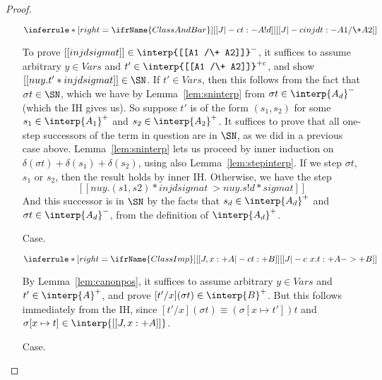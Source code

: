 \begin{proof}
\begin{itemize}
\vspace{-.2cm}
\begin{center}
\begin{math}
\inferrule* [right=\ifrName{ClassAndBar}] {[[J |-c t : - A ! d]]}{[[J |-c inj d t : - A1 /\+ A2]]}
\end{math}
\end{center}
To prove $[[inj d sigma t]]\in\interp{[[A1 /\+ A2]]}^-$, it suffices
to assume arbitrary $y\in\textit{Vars}$ and $t'\in\interp{[[A1 /\+
  A2]]}^{+c}$, and show $[[ nu y . t' * inj d sigma t]]\in\SN$.  If
$t'\in\textit{Vars}$, then this follows from the fact that $\sigma
t\in\SN$, which we have by Lemma~\ref{lem:sninterp} from $\sigma
t\in\interp{A_d}^-$ (which the IH gives us).  So suppose $t'$ is of
the form $(s_1,s_2)$ for some $s_1\in\interp{A_1}^+$ and
$s_2\in\interp{A_2}^+$.  It suffices to prove that all one-step
successors of the term in question are in $\SN$, as we did in a
previous case above.  Lemma~\ref{lem:sninterp} lets us proceed by
inner induction on $\delta(\sigma t) + \delta(s_1) + \delta(s_2)$,
using also Lemma~\ref{lem:stepinterp}.  If we step $\sigma t$, $s_1$
or $s_2$, then the result holds by inner IH.  Otherwise, we have the
step
\[
[[ nu y . (s1,s2) * inj d sigma t ~> nu y . s ! d * sigma t]]
\]
And this successor is in $\SN$ by the facts that $s_d\in\interp{A_d}^+$
and $\sigma t\in\interp{A_d}^-$, from the definition of $\interp{A_d}^+$.

\item[Case.]\ 

\vspace{-.2cm}
\begin{center}
\begin{math}
\inferrule* [right=\ifrName{ClassImp}] {[[J , x : + A |-c t : + B]]}{[[J |-c \ x . t : + A ->+ B]]}
\end{math}
\end{center}
By Lemma~\ref{lem:canonpos}, it suffices to assume arbitrary $y\in\textit{Vars}$ and $t'\in\interp{A}^+$,
and prove $[t'/x](\sigma t)\in\interp{B}^+$.  But this follows immediately from the IH, since
$[t'/x](\sigma t)\equiv (\sigma[x\mapsto t']) t$ and $\sigma[x\mapsto t]\in\interp{[[J , x : + A]]}$.

\item[Case.]\ 


\end{itemize}
\end{proof}
